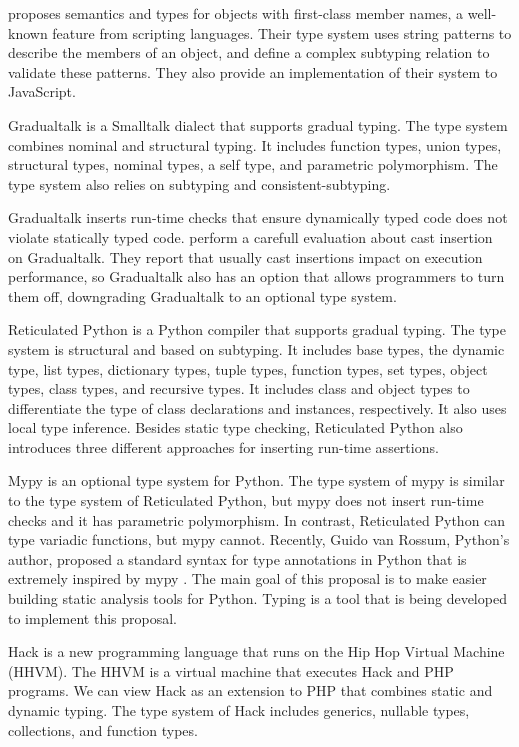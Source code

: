 \citet{politz2012semantics} proposes semantics and types for objects
with first-class member names, a well-known feature from scripting languages.
Their type system uses string patterns to describe the members of
an object, and define a complex subtyping relation to validate
these patterns.
They also provide an implementation of their system to JavaScript.

Gradualtalk \citep{allende2013gts} is a Smalltalk dialect that
supports gradual typing.
The type system combines nominal and structural typing.
It includes function types, union types, structural types,
nominal types, a self type, and parametric polymorphism.
The type system also relies on subtyping and consistent-subtyping.

Gradualtalk inserts run-time checks that ensure dynamically
typed code does not violate statically typed code.
\citet{allende2013cis} perform a carefull evaluation about
cast insertion on Gradualtalk.
They report that usually cast insertions impact on execution
performance, so Gradualtalk also has an option that allows
programmers to turn them off, downgrading Gradualtalk
to an optional type system.

Reticulated Python \citep{vitousek2014deg} is a Python compiler
that supports gradual typing.
The type system is structural and based on subtyping.
It includes base types, the dynamic type, list types,
dictionary types, tuple types, function types, set types,
object types, class types, and recursive types.
It includes class and object types to differentiate the
type of class declarations and instances, respectively.
It also uses local type inference.
Besides static type checking, Reticulated Python also introduces
three different approaches for inserting run-time assertions.

Mypy \citep{mypy} is an optional type system for Python.
The type system of mypy is similar to the type system of
Reticulated Python, but mypy does not insert run-time checks
and it has parametric polymorphism.
In contrast, Reticulated Python can type variadic functions,
but mypy cannot.
Recently, Guido van Rossum, Python's author, proposed a
standard syntax for type annotations in Python \citep{PEP483}
that is extremely inspired by mypy \citep{PEP484}.
The main goal of this proposal is to make easier building
static analysis tools for Python.
Typing \citep{typing} is a tool that is being developed to
implement this proposal.

Hack \citep{hack} is a new programming language that runs on the
Hip Hop Virtual Machine (HHVM).
The HHVM is a virtual machine that executes Hack and PHP programs.
We can view Hack as an extension to PHP that combines static and
dynamic typing.
The type system of Hack includes generics, nullable types, collections,
and function types.

